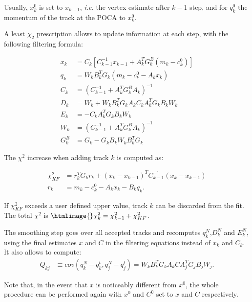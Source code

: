 \documentclass[12pt,final]{article}
\begin{document}
Usually, $x^0_k$ is set to $x_{k-1}$, {\it i.e.} the vertex estimate after $k-1$ step, and for $q^0_k$ 
the momentum of the track at the POCA to $x^0_k$.

A least $\chi_2$ prescription allows to update information at each step, with the following filtering formula:

\begin{equation}
\begin{aligned}
x_k &= C_k[C_{k-1}^{-1} x_{k-1} + A^T_k G^B_k(m_k-c^0_k)]\\
q_k &= W_k B^T_k G_k (m_k - c^0_k  -  A_k x_k)\\
C_k &= (C_{k-1}^{-1} + A^T_k G^B_k A_k)^{-1}\\
D_k &= W_k + W_k B^T_k G_k A_k C_k A^T_k G_k B_k W_k\\
E_k &= -C_k A^T_k G_k B_k W_k\\
W_k &= (C_{k-1}^{-1} + A^T_k G^B_k A_k)^{-1}\\
G^B_k &= G_k - G_k B_k W_k B^T_k G_k 
\end{aligned}
\end{equation}

The $\chi^2$ increase when adding track $k$ is computed as:

\begin{equation}
\begin{aligned}
\chi^2_{KF} &= r^T_k G_k r_k + (x_k - x_{k-1})^T C_{k-1}^{-1} (x_k - x_{k-1})\\
        r_k &= m_k - c^0_k - A_k x_k - B_k q_k.
\end{aligned}
\end{equation}

If $\chi^2_{KF}$ exceeds a user defined upper value, track $k$ can be discarded from 
the fit. The total $\chi^2$ is $\htmlimage{}\displaystyle{\chi^2_k = \chi^2_{k-1} + \chi^2_{KF}}$.

The smoothing step goes over all accepted tracks and recomputes $q^N_k$,$D^N_k$ and $E^N_k$, using
the final estimates $x$ and $C$ in the filtering equations instead of $x_k$ and $C_k$. It also 
allows to compute:
\begin{equation}
\begin{aligned}
Q_{kj} &\equiv cov(q^N_k-q^t_k,q^N_j-q^t_j) = W_k B^T_k G_k A_k C A^T_j G_j B_j W_j.
\end{aligned}
\end{equation}

Note that, in the event that $x$ is noticeably different from $x^0$, the whole procedure
can be performed again with $x^0$ and $C^0$ set to $x$ and $C$ respectively.
\end{document}
